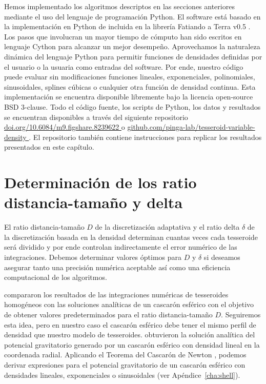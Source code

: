 Hemos implementado los algoritmos descriptos en las secciones anteriores
mediante el uso del lenguaje de programación Python.
El software está basado en la implementación en Python de \citet{uieda2016}
incluida en la librería Fatiando a Terra v0.5 \citep{uieda2013}.
Los pasos que involucran un mayor tiempo de cómputo han sido escritos en
lenguaje Cython para alcanzar un mejor desempeño.
Aprovechamos la naturaleza dinámica del lenguaje Python para permitir funciones
de densidades definidas por el usuario o la usuaria como entradas del software.
Por ende, nuestro código puede evaluar sin modificaciones funciones lineales,
exponenciales, polinomiales, sinusoidales, splines cúbicas o cualquier otra
función de densidad continua.
Esta implementación se encuentra disponible libremente bajo la licencia
open-source BSD 3-clause.
Todo el código fuente, los scripts de Python, los datos y resultados se
encuentran disponibles a través del siguiente repositorio
\href{
    https://doi.org/10.6084/m9.figshare.8239622
}{
    doi.org/10.6084/m9.figshare.8239622
}
\citep{soler2019b} o
\href{
    https://github.com/pinga-lab/tesseroid-variable-density
}{
    github.com/pinga-lab/tesseroid-variable-density
}.
El repositorio también contiene instrucciones para replicar los resultados
presentados en este capítulo.



\section{Determinación de los ratio distancia-tamaño y delta}

El ratio distancia-tamaño $D$ de la discretización adaptativa y el ratio delta
$\delta$ de la discretización basada en la densidad determinan cuantas veces
cada tesseroide será dividido y por ende controlan indirectamente el error
numérico de las integraciones.
Debemos determinar valores óptimos para $D$ y $\delta$ si deseamos asegurar
tanto una precisión numérica aceptable así como una eficiencia computacional de
los algoritmos.

\citet{uieda2016} compararon los resultados de las integraciones numéricas de
tesseroides homogéneos con las soluciones analíticas de un cascarón esférico
\citep{mikuska2006, grombein2013} con el objetivo de obtener valores
predeterminados para el ratio distancia-tamaño $D$.
Seguiremos esta idea, pero en nuestro caso el cascarón esférico debe tener el
mismo perfil de densidad que nuestro modelo de tesseroides. \citet{lin2019}
obtuvieron la solución analítica del potencial gravitatorio generado por un
cascarón esférico con densidad lineal en la coordenada radial.
Aplicando el Teorema del Cascarón de Newton \citep{chandrasekhar1995,
binney2008}, podemos derivar expresiones para el potencial gravitatorio de un
cascarón esférico con densidades lineales, exponenciales o sinusoidales (ver
Apéndice~\ref{cha:shell}).

